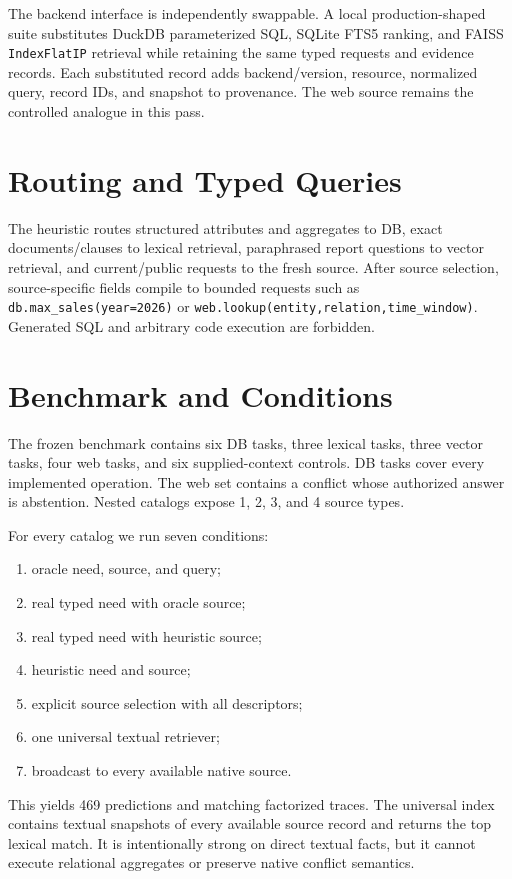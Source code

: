 \documentclass[11pt]{article}
\begin{document}
The backend interface is independently swappable. A local production-shaped
suite substitutes DuckDB parameterized SQL, SQLite FTS5 ranking, and FAISS
\texttt{IndexFlatIP} retrieval while retaining the same typed requests and
evidence records. Each substituted record adds backend/version, resource,
normalized query, record IDs, and snapshot to provenance. The web source remains
the controlled analogue in this pass.

\section{Routing and Typed Queries}
The heuristic routes structured attributes and aggregates to DB, exact
documents/clauses to lexical retrieval, paraphrased report questions to vector
retrieval, and current/public requests to the fresh source. After source
selection, source-specific fields compile to bounded requests such as
\texttt{db.max\_sales(year=2026)} or
\texttt{web.lookup(entity,relation,time\_window)}. Generated SQL and arbitrary
code execution are forbidden.

\section{Benchmark and Conditions}
The frozen benchmark contains six DB tasks, three lexical tasks, three vector
tasks, four web tasks, and six supplied-context controls. DB tasks cover every
implemented operation. The web set contains a conflict whose authorized answer
is abstention. Nested catalogs expose 1, 2, 3, and 4 source types.

For every catalog we run seven conditions:
\begin{enumerate}
\item oracle need, source, and query;
\item real typed need with oracle source;
\item real typed need with heuristic source;
\item heuristic need and source;
\item explicit source selection with all descriptors;
\item one universal textual retriever;
\item broadcast to every available native source.
\end{enumerate}
This yields 469 predictions and matching factorized traces. The universal index
contains textual snapshots of every available source record and returns the
top lexical match. It is intentionally strong on direct textual facts, but it
cannot execute relational aggregates or preserve native conflict semantics.
\end{document}

